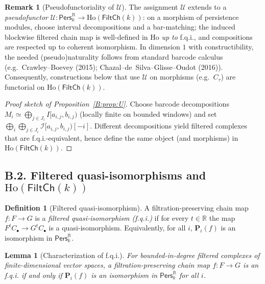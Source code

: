 \documentclass[11pt]{article}
\newcommand{\Pers}{\mathsf{Pers}}
\newcommand{\Ho}{\mathrm{Ho}}
\numberwithin{equation}{section}
\newtheorem{lemma}[theorem]{Lemma}
\theoremstyle{definition}
\newtheorem{definition}[theorem]{Definition}
\newtheorem{remark}[theorem]{Remark}
\begin{document}
\begin{remark}[Pseudofunctoriality of \(\mathcal{U}\)]
The assignment \(\mathcal{U}\) extends to a \emph{pseudofunctor}
\(\mathcal{U}:\Pers^{\mathrm{ft}}_k\to \Ho(\mathsf{FiltCh}(k))\): on a morphism of persistence modules, choose interval decompositions and a bar-matching; the induced blockwise filtered chain map is well-defined in \(\Ho\) \emph{up to} f.q.i., and compositions are respected up to coherent isomorphism.
In dimension \(1\) with constructibility, the needed (pseudo)naturality follows from standard barcode calculus (e.g.\ Crawley--Boevey (2015); Chazal--de~Silva--Glisse--Oudot (2016)).
Consequently, constructions below that use \(\mathcal{U}\) on morphisms (e.g.\ \(C_\tau\)) are functorial on \(\Ho(\mathsf{FiltCh}(k))\).
\end{remark}

\begin{proof}[Proof sketch of Proposition~\ref{B:prop:U}]
Choose barcode decompositions \(M_i\simeq \bigoplus_{j\in J_i} I[a_{i,j},b_{i,j})\) (locally finite on bounded windows) and set
\(\bigoplus_{i}\bigoplus_{j\in J_i}\mathcal{I}[a_{i,j},b_{i,j})[-i]\).
Different decompositions yield filtered complexes that are f.q.i.-equivalent, hence define the same object (and morphisms) in \(\Ho(\mathsf{FiltCh}(k))\).
\end{proof}

\subsection*{B.2. Filtered quasi-isomorphisms and \texorpdfstring{$\Ho(\mathsf{FiltCh}(k))$}{Ho(FiltCh(k))}}
\begin{definition}[Filtered quasi-isomorphism]
A filtration-preserving chain map \(f:F\to G\) is a \emph{filtered quasi-isomorphism (f.q.i.)} if for every \(t\in\mathbb{R}\) the map \(F^{t}C_\bullet\to G^{t}C_\bullet\) is a quasi-isomorphism.
Equivalently, for all \(i\), \(\mathbf{P}_i(f)\) is an isomorphism in \(\Pers^{\mathrm{ft}}_k\).
\end{definition}

\begin{lemma}[Characterization of f.q.i.]
For bounded-in-degree filtered complexes of finite-dimensional vector spaces, a filtration-preserving chain map \(f:F\to G\) is an f.q.i. if and only if \(\mathbf{P}_i(f)\) is an isomorphism in \(\Pers^{\mathrm{ft}}_k\) for all \(i\).
\end{lemma}
\end{document}
